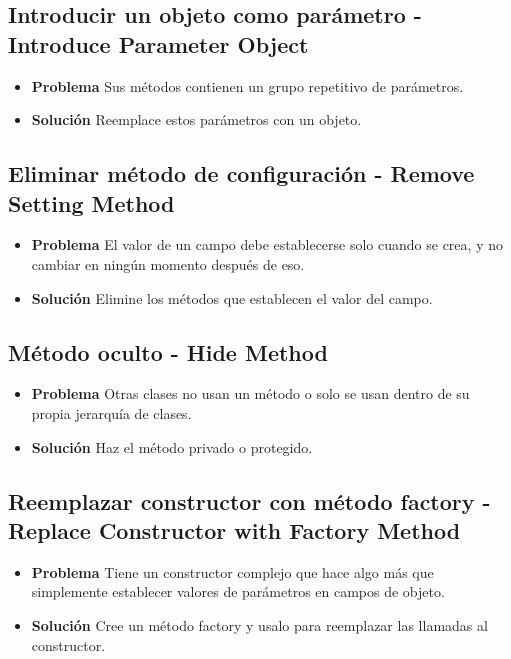 \documentclass[11pt,a4paper,oneside]{book}
\begin{document}


\subsection{Introducir un objeto como parámetro - Introduce Parameter Object}
\label{introduceobjetoparametro}
\begin{itemize}
    \item \textbf{Problema} Sus métodos contienen un grupo repetitivo de parámetros.   
   \item \textbf{Solución} Reemplace estos parámetros con un objeto.
\end{itemize}

\subsection{Eliminar método de configuración - Remove Setting Method}
\label{eliminarmetodoconfig}
\begin{itemize}
    \item \textbf{Problema} El valor de un campo debe establecerse solo cuando se crea, y no cambiar en ningún momento después de eso.
    \item \textbf{Solución}  Elimine los métodos que establecen el valor del campo.
\end{itemize}

\subsection{Método oculto - Hide Method}
\label{metodooculto}
\begin{itemize}
    \item \textbf{Problema} Otras clases no usan un método o solo se usan dentro de su propia jerarquía de clases.
    \item \textbf{Solución} Haz el método privado o protegido.
\end{itemize}

\subsection{Reemplazar constructor con método factory - Replace Constructor with Factory Method}
\label{reemplazarconstructorfactory}
\begin{itemize}
    \item \textbf{Problema} Tiene un constructor complejo que hace algo más que simplemente establecer valores de parámetros en campos de objeto.
    \item \textbf{Solución} Cree un método factory y usalo para reemplazar las llamadas al  constructor.
\end{itemize}
    
\end{document}
